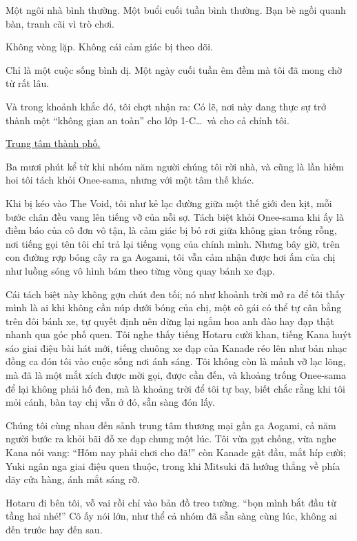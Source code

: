 \documentclass[../main.tex]{subfiles}
\begin{document}
Một ngôi nhà bình thường. Một buổi cuối tuần bình thường. Bạn bè ngồi quanh bàn, tranh cãi vì trò chơi.

Không vòng lặp. Không cái cảm giác bị theo dõi.

Chỉ là một cuộc sống bình dị. Một ngày cuối tuần êm đềm mà tôi đã mong chờ từ rất lâu.

Và trong khoảnh khắc đó, tôi chợt nhận ra: Có lẽ, nơi này đang thực sự trở thành một ``không gian an toàn'' cho lớp 1-C\dots\ và cho cả chính tôi.

\begin{center}
  \uline{Trung tâm thành phố.}
\end{center}

Ba mươi phút kể từ khi nhóm năm người chúng tôi rời nhà, và cũng là lần hiếm hoi tôi tách khỏi Onee-sama, nhưng với một tâm thế khác.

Khi bị kéo vào The Void, tôi như kẻ lạc đường giữa một thế giới đen kịt, mỗi bước chân đều vang lên tiếng vỡ của nỗi sợ. Tách biệt khỏi Onee-sama khi ấy là điềm báo của cô đơn vô tận, là cảm giác bị bỏ rơi giữa không gian trống rỗng, nơi tiếng gọi tên tôi chỉ trả lại tiếng vọng của chính mình. Nhưng bây giờ, trên con đường rợp bóng cây ra ga Aogami, tôi vẫn cảm nhận được hơi ấm của chị như luồng sóng vô hình bám theo từng vòng quay bánh xe đạp.

Cái tách biệt này không gợn chút đen tối; nó như khoảnh trời mở ra để tôi thấy mình là ai khi không cần núp dưới bóng của chị, một cô gái có thể tự cân bằng trên đôi bánh xe, tự quyết định nên dừng lại ngắm hoa anh đào hay đạp thật nhanh qua góc phố quen. Tôi nghe thấy tiếng Hotaru cười khan, tiếng Kana huýt sáo giai điệu bài hát mới, tiếng chuông xe đạp của Kanade réo lên như bản nhạc đồng ca đón tôi vào cuộc sống nơi ánh sáng. Tôi không còn là mảnh vỡ lạc lõng, mà đã là một mắt xích được mời gọi, được cần đến, và khoảng trống Onee-sama để lại không phải hố đen, mà là khoảng trời để tôi tự bay, biết chắc rằng khi tôi mỏi cánh, bàn tay chị vẫn ở đó, sẵn sàng đón lấy.

Chúng tôi cùng nhau đến sảnh trung tâm thương mại gần ga Aogami, cả năm người bước ra khỏi bãi đỗ xe đạp chung một lúc. Tôi vừa gạt chống, vừa nghe Kana nói vang: ``Hôm nay phải chơi cho đã!'' còn Kanade gật đầu, mắt híp cười; Yuki ngân nga giai điệu quen thuộc, trong khi Mitsuki đã hướng thẳng về phía dãy cửa hàng, ánh mắt sáng rỡ.

Hotaru đi bên tôi, vỗ vai rồi chỉ vào bản đồ treo tường. ``bọn mình bắt đầu từ tầng hai nhé!'' Cô ấy nói lớn, như thể cả nhóm đã sẵn sàng cùng lúc, không ai đến trước hay đến sau.
\end{document}
